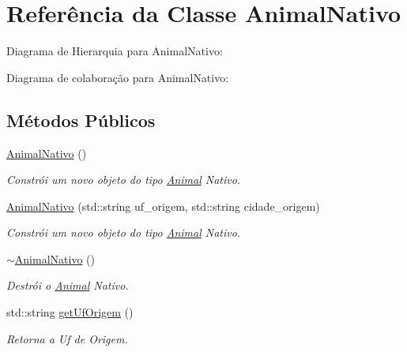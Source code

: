\hypertarget{classAnimalNativo}{}\section{Referência da Classe Animal\+Nativo}
\label{classAnimalNativo}


Diagrama de Hierarquia para Animal\+Nativo\+:


Diagrama de colaboração para Animal\+Nativo\+:
\subsection*{Métodos Públicos}
\begin{DoxyCompactItemize}
\item 
\mbox{\label{classAnimalNativo_a166ca155fc305b9ae674546988b27f94}} 
\hyperlink{classAnimalNativo_a166ca155fc305b9ae674546988b27f94}{Animal\+Nativo} ()
\begin{DoxyCompactList}\small\item\em Constrói um novo objeto do tipo \hyperlink{classAnimal}{Animal} Nativo. \end{DoxyCompactList}\item 
\hyperlink{classAnimalNativo_ad9ccd46e6a0e7129655d598548cf972b}{Animal\+Nativo} (std\+::string uf\+\_\+origem, std\+::string cidade\+\_\+origem)
\begin{DoxyCompactList}\small\item\em Constrói um novo objeto do tipo \hyperlink{classAnimal}{Animal} Nativo. \end{DoxyCompactList}\item 
\mbox{\label{classAnimalNativo_a365f41847e6c472b7c549f0c927929d5}} 
\hyperlink{classAnimalNativo_a365f41847e6c472b7c549f0c927929d5}{$\sim$\+Animal\+Nativo} ()
\begin{DoxyCompactList}\small\item\em Destrói o \hyperlink{classAnimal}{Animal} Nativo. \end{DoxyCompactList}\item 
std\+::string \hyperlink{classAnimalNativo_a4adb947e6542cdb4ac9be98cbe2450d7}{get\+Uf\+Origem} ()
\begin{DoxyCompactList}\small\item\em Retorna a Uf de Origem. \end{DoxyCompactList}\item 

\end{DoxyCompactItemize}
